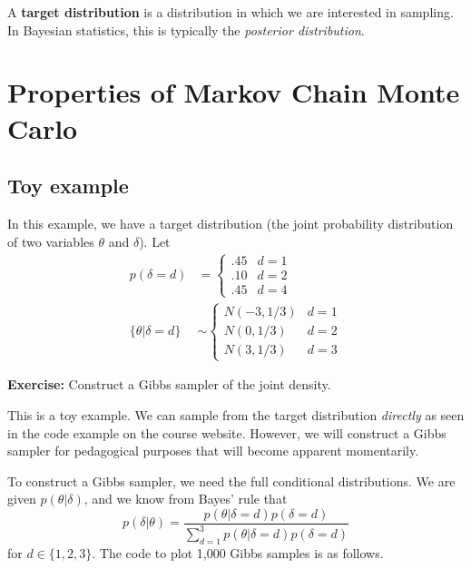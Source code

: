 \documentclass[titlepage, 12pt, leqno]{article}
\begin{document}
\begin{definition}
    A \textbf{target distribution} is a distribution in which we are interested
    in sampling. In Bayesian statistics, this is typically the 
    \textit{posterior distribution}.
\end{definition}

\pagebreak
\section{Properties of Markov Chain Monte Carlo}
\subsection{Toy example}
In this example, we have a target distribution (the joint probability
distribution of two variables $\theta$ and $\delta$). Let
\begin{align*}
    p(\delta = d) &=
    \begin{cases}
        .45 & d=1 \\
        .10 & d=2 \\
        .45 & d=4
    \end{cases}
    \\
    \{\theta|\delta = d\} & \sim 
    \begin{cases}
        N(-3, 1/3) & d=1 \\
        N(0, 1/3) & d=2 \\
        N(3, 1/3) & d=3
    \end{cases}
\end{align*}

\textbf{Exercise:} Construct a Gibbs sampler of the joint density.

\begin{note}
    This is a toy example. We can sample from the target distribution
    \textit{directly} as seen in the code example on the course website. 
    However, we will construct a Gibbs sampler for pedagogical purposes that 
    will become apparent momentarily.
\end{note}

To construct a Gibbs sampler, we need the full conditional distributions. We
are given $p(\theta|\delta)$, and we know from Bayes' rule that
\[
p(\delta|\theta) = \frac{p(\theta|\delta=d)p(\delta=d)}
{\sum_{d=1}^{3}p(\theta|\delta=d)p(\delta=d)}
\]
for $d \in  \{1,2,3\}$. The code to plot 1,000 Gibbs samples is as follows.
\pagebreak
\end{document}
